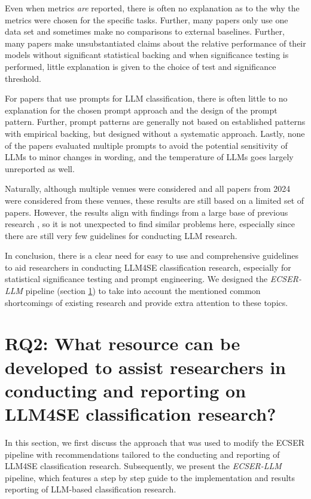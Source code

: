 \documentclass[a4paper]{article}
\newcommand{\newecser}{\textit{ECSER-LLM} }
\begin{document}
Even when metrics \textit{are} reported, there is often no explanation as to the why the metrics were chosen for the specific tasks. Further, many papers only use one data set and sometimes make no comparisons to external baselines. Further, many papers make unsubstantiated claims about the relative performance of their models without significant statistical backing and when significance testing is performed, little explanation is given to the choice of test and significance threshold. 

For papers that use prompts for LLM classification, there is often little to no explanation for the chosen prompt approach and the design of the prompt pattern. Further, prompt patterns are generally not based on established patterns with empirical backing, but designed without a systematic approach. Lastly, none of the papers evaluated multiple prompts to avoid the potential sensitivity of LLMs to minor changes in wording, and the temperature of LLMs goes largely unreported as well. 

Naturally, although multiple venues were considered and all papers from 2024 were considered from these venues, these results are still based on a limited set of papers. However, the results align with findings from a large base of previous research \cite{Dellanna2022,hou2024,guo2023survey,kitchenham2002,Menzies2012}, so it is not unexpected to find similar problems here, especially since there are still very few guidelines for conducting LLM research.

In conclusion, there is a clear need for easy to use and comprehensive guidelines to aid researchers in conducting LLM4SE classification research, especially for statistical significance testing and prompt engineering. We designed the \newecser pipeline (section \ref{RQ2}) to take into account the mentioned common shortcomings of existing research and provide extra attention to these topics. 

\section{RQ2: What resource can be developed to assist researchers in conducting and reporting on LLM4SE classification research?}
\label{RQ2}
In this section, we first discuss the approach that was used to modify the ECSER pipeline with recommendations tailored to the conducting and reporting of LLM4SE classification research. Subsequently, we present the \newecser pipeline, which features a step by step guide to the implementation and results reporting of LLM-based classification research. 
\end{document}
